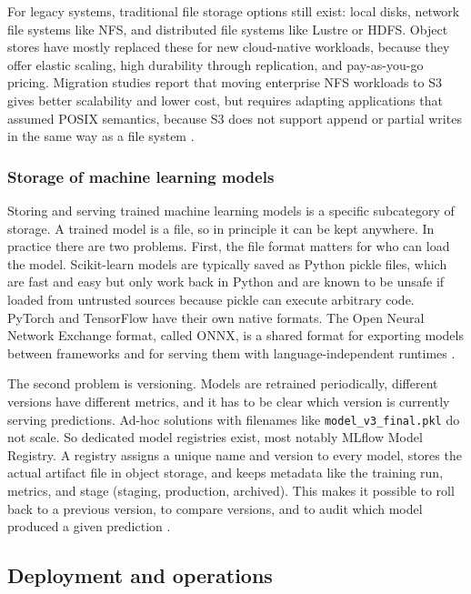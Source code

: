 For legacy systems, traditional file storage options still exist: local disks, network file systems like NFS, and distributed file systems like Lustre or HDFS. Object stores have mostly replaced these for new cloud-native workloads, because they offer elastic scaling, high durability through replication, and pay-as-you-go pricing. Migration studies report that moving enterprise NFS workloads to S3 gives better scalability and lower cost, but requires adapting applications that assumed POSIX semantics, because S3 does not support append or partial writes in the same way as a file system \autocite{alti2024nfs_s3}.

\subsubsection{Storage of machine learning models}
\label{sec:ml-storage}

Storing and serving trained machine learning models is a specific subcategory of storage. A trained model is a file, so in principle it can be kept anywhere. In practice there are two problems. First, the file format matters for who can load the model. Scikit-learn models are typically saved as Python pickle files, which are fast and easy but only work back in Python and are known to be unsafe if loaded from untrusted sources because pickle can execute arbitrary code. PyTorch and TensorFlow have their own native formats. The Open Neural Network Exchange format, called ONNX, is a shared format for exporting models between frameworks and for serving them with language-independent runtimes \autocite{kubeflow_model_artifact_2024, fortra_pickle_2025}.

The second problem is versioning. Models are retrained periodically, different versions have different metrics, and it has to be clear which version is currently serving predictions. Ad-hoc solutions with filenames like \texttt{model\_v3\_final.pkl} do not scale. So dedicated model registries exist, most notably MLflow Model Registry. A registry assigns a unique name and version to every model, stores the actual artifact file in object storage, and keeps metadata like the training run, metrics, and stage (staging, production, archived). This makes it possible to roll back to a previous version, to compare versions, and to audit which model produced a given prediction \autocite{mlflow_registry_2025, lakefs_mlflow_2024}.

\subsection{Deployment and operations}
\label{sec:deployment}

